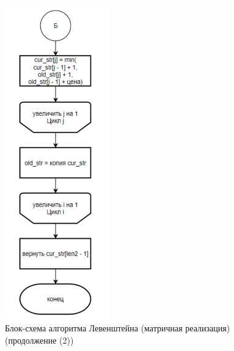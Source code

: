 \begin{figure}[H]
    \centering
    \includegraphics[width=0.4\textwidth]{img/block_1_1_3.png}
    \caption{Блок-схема алгоритма Левенштейна (матричная реализация) (продолжение (2))}
\end{figure}

